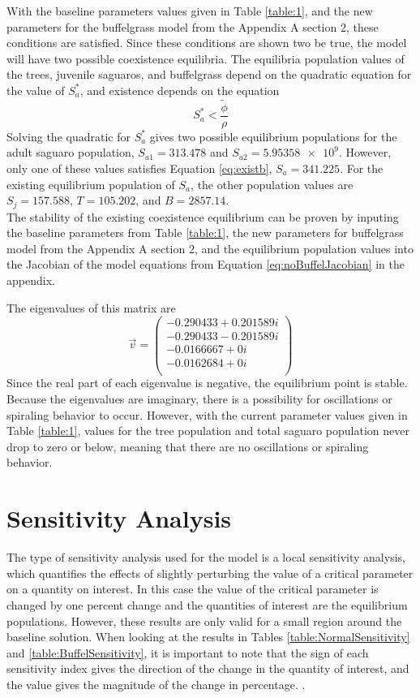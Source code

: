 \documentclass[a4paper]{article}
\begin{document}
With the baseline parameters values given in Table \ref{table:1}, and the new parameters for the buffelgrass model from the Appendix A section 2, these conditions are satisfied.
Since these conditions are shown two be true, the model will have two possible coexistence equilibria. The equilibria population values of the trees, juvenile saguaros, and buffelgrass depend on the quadratic equation for the value of $S_a^*$, and existence depends on the equation
\begin{equation}\label{eq:existb}
S_a^*<\displaystyle\frac{\tilde{\phi}}{\rho}
\end{equation}
Solving the quadratic for $S_a^*$ gives two possible equilibrium populations for the adult saguaro population, $S_{a1} = 313.478$ and $S_{a2} = \num{5.95358e9}$. However, only one of these values satisfies Equation \ref{eq:existb}, $S_a = 341.225$. For the existing equilibrium population of $S_a$, the other population values are $S_j = 157.588$, $T = 105.202$, and $B = 2857.14$.\\

The stability of the existing coexistence equilibrium can be proven by inputing the baseline parameters from Table \ref{table:1}, the new parameters for buffelgrass model from the Appendix A section 2, and the equilibrium population values into the Jacobian of the model equations from Equation \ref{eq:noBuffelJacobian} in the appendix.

The eigenvalues of this matrix are $$\vec{v} = \begin{pmatrix}
-0.290433 + 0.201589i\\
-0.290433 - 0.201589i\\
-0.0166667 + 0i\\
-0.0162684 + 0i\\
\end{pmatrix}$$ 
Since the real part of each eigenvalue is negative, the equilibrium point is stable. Because the eigenvalues are imaginary, there is a possibility for oscillations or spiraling behavior to occur. However, with the current parameter values given in Table \ref{table:1}, values for the tree population and total saguaro population never drop to zero or below, meaning that there are no oscillations or spiraling behavior.
\section{Sensitivity Analysis}
The type of sensitivity analysis used for the model is a local sensitivity analysis, which quantifies the effects of slightly perturbing the value of a critical parameter on a quantity on interest. In this case the value of the critical parameter is changed by one percent change and the quantities of interest are the equilibrium populations. However, these results are only valid for a small region around the baseline solution. When looking at the results in Tables \ref{table:NormalSensitivity} and \ref{table:BuffelSensitivity}, it is important to note that the sign of each sensitivity index gives the direction of the change in the quantity of interest, and the value gives the magnitude of the change in percentage. \cite{sensitivitySource}.
\end{document}
